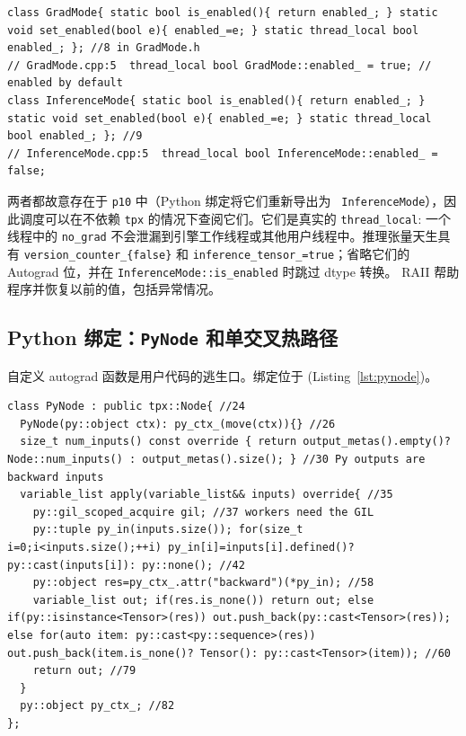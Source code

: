 \begin{lstlisting}[caption={and .}, label=lst:gradmode]
class GradMode{ static bool is_enabled(){ return enabled_; } static void set_enabled(bool e){ enabled_=e; } static thread_local bool enabled_; }; //8 in GradMode.h
// GradMode.cpp:5  thread_local bool GradMode::enabled_ = true; // enabled by default
class InferenceMode{ static bool is_enabled(){ return enabled_; } static void set_enabled(bool e){ enabled_=e; } static thread_local bool enabled_; }; //9
// InferenceMode.cpp:5  thread_local bool InferenceMode::enabled_ = false;
\end{lstlisting}

两者都故意存在于 \texttt{p10} 中（Python 绑定将它们重新导出为 \texttt{ InferenceMode}），因此调度可以在不依赖 \texttt{tpx} 的情况下查阅它们。它们是真实的 \texttt{thread\_local}: 一个线程中的 \texttt{no\_grad} 不会泄漏到引擎工作线程或其他用户线程中。推理张量天生具有 \texttt{version\_counter\_\{false\}} 和 \texttt{inference\_tensor\_=true}；省略它们的 Autograd 位，并在 \texttt{InferenceMode::is\_enabled} 时跳过 dtype 转换。 RAII 帮助程序并恢复以前的值，包括异常情况。

\subsection{Python 绑定：\texttt{PyNode} 和单交叉热路径}
\label{subsec:pynode}

自定义 autograd 函数是用户代码的逃生口。绑定位于 (Listing~\ref{lst:pynode})。

\begin{lstlisting}[caption={\texttt{PyNode}.}, label=lst:pynode]
class PyNode : public tpx::Node{ //24
  PyNode(py::object ctx): py_ctx_(move(ctx)){} //26
  size_t num_inputs() const override { return output_metas().empty()? Node::num_inputs() : output_metas().size(); } //30 Py outputs are backward inputs
  variable_list apply(variable_list&& inputs) override{ //35
    py::gil_scoped_acquire gil; //37 workers need the GIL
    py::tuple py_in(inputs.size()); for(size_t i=0;i<inputs.size();++i) py_in[i]=inputs[i].defined()? py::cast(inputs[i]): py::none(); //42
    py::object res=py_ctx_.attr("backward")(*py_in); //58
    variable_list out; if(res.is_none()) return out; else if(py::isinstance<Tensor>(res)) out.push_back(py::cast<Tensor>(res)); else for(auto item: py::cast<py::sequence>(res)) out.push_back(item.is_none()? Tensor(): py::cast<Tensor>(item)); //60
    return out; //79
  }
  py::object py_ctx_; //82
};
\end{lstlisting}

